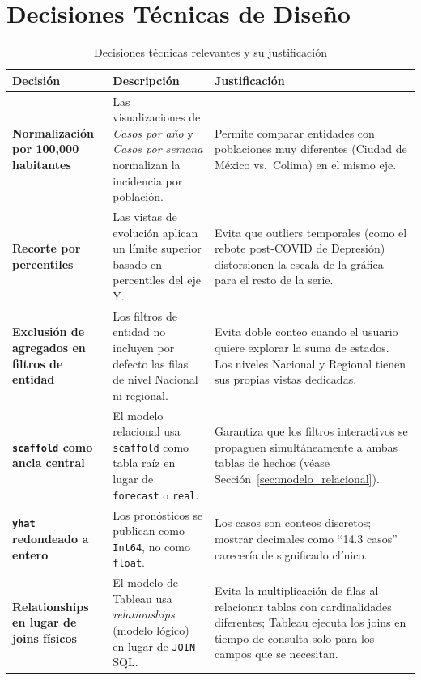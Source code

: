 \documentclass[12pt, letterpaper]{article}
\newcommand{\secref}[1]{Sección~\ref{#1}}
\begin{document}
\newpage
\section{Decisiones Técnicas de Diseño}\label{sec:decisiones}

\begin{table}[H]
\centering
\caption{Decisiones técnicas relevantes y su justificación}
\label{tab:decisiones}
\scriptsize
\setlength{\tabcolsep}{4pt}
\begin{tabularx}{\textwidth}{>{\bfseries}p{3.2cm} X X}
\toprule
\textbf{Decisión} & \textbf{Descripción} & \textbf{Justificación} \\
\midrule
Normalización por 100,000 habitantes & Las visualizaciones de \textit{Casos por año} y \textit{Casos por semana} normalizan la incidencia por población. & Permite comparar entidades con poblaciones muy diferentes (Ciudad de México vs.\ Colima) en el mismo eje. \\
\addlinespace
Recorte por percentiles & Las vistas de evolución aplican un límite superior basado en percentiles del eje Y. & Evita que outliers temporales (como el rebote post-COVID de Depresión) distorsionen la escala de la gráfica para el resto de la serie. \\
\addlinespace
Exclusión de agregados en filtros de entidad & Los filtros de entidad no incluyen por defecto las filas de nivel Nacional ni regional. & Evita doble conteo cuando el usuario quiere explorar la suma de estados. Los niveles Nacional y Regional tienen sus propias vistas dedicadas. \\
\addlinespace
\texttt{scaffold} como ancla central & El modelo relacional usa \texttt{scaffold} como tabla raíz en lugar de \texttt{forecast} o \texttt{real}. & Garantiza que los filtros interactivos se propaguen simultáneamente a ambas tablas de hechos (véase \secref{sec:modelo_relacional}). \\
\addlinespace
\texttt{yhat} redondeado a entero & Los pronósticos se publican como \texttt{Int64}, no como \texttt{float}. & Los casos son conteos discretos; mostrar decimales como ``14.3 casos'' carecería de significado clínico. \\
\addlinespace
Relationships en lugar de joins físicos & El modelo de Tableau usa \textit{relationships} (modelo lógico) en lugar de \texttt{JOIN} SQL. & Evita la multiplicación de filas al relacionar tablas con cardinalidades diferentes; Tableau ejecuta los joins en tiempo de consulta solo para los campos que se necesitan. \\
\bottomrule
\end{tabularx}
\end{table}
\end{document}
